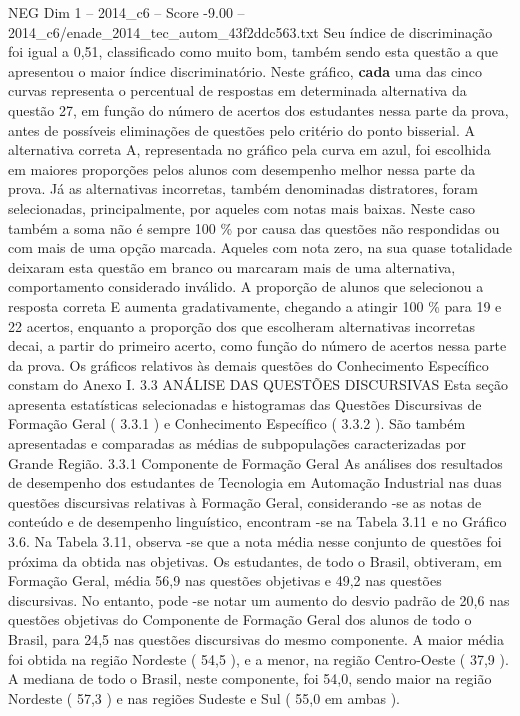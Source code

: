 \begin{textsample}{NEG Dim 1 – 2014\_c6 – Score -9.00 – 2014\_c6/enade\_2014\_tec\_autom\_43f2ddc563.txt}
Seu índice de discriminação foi igual a 0,51, classificado como muito bom, também sendo esta questão a que apresentou o maior índice discriminatório.
Neste gráfico, \textbf{cada} uma das cinco curvas representa o percentual de respostas em determinada alternativa da questão 27, em função do número de acertos dos estudantes nessa parte da prova, antes de possíveis eliminações de questões pelo critério do ponto bisserial.
A alternativa correta A, representada no gráfico pela curva em azul, foi escolhida em maiores proporções pelos alunos com desempenho melhor nessa parte da prova.
Já as alternativas incorretas, também denominadas distratores, foram selecionadas, principalmente, por aqueles com notas mais baixas.
Neste caso também a soma não é sempre 100 \% por causa das questões não respondidas ou com mais de uma opção marcada.
Aqueles com nota zero, na sua quase totalidade deixaram esta questão em branco ou marcaram mais de uma alternativa, comportamento considerado inválido.
A proporção de alunos que selecionou a resposta correta E aumenta gradativamente, chegando a atingir 100 \% para 19 e 22 acertos, enquanto a proporção dos que escolheram alternativas incorretas decai, a partir do primeiro acerto, como função do número de acertos nessa parte da prova.
Os gráficos relativos às demais questões do Conhecimento Específico constam do Anexo I. 3.3 ANÁLISE DAS QUESTÕES DISCURSIVAS Esta seção apresenta estatísticas selecionadas e histogramas das Questões Discursivas de Formação Geral ( 3.3.1 ) e Conhecimento Específico ( 3.3.2 ).
São também apresentadas e comparadas as médias de subpopulações caracterizadas por Grande Região. 3.3.1 Componente de Formação Geral As análises dos resultados de desempenho dos estudantes de Tecnologia em Automação Industrial nas duas questões discursivas relativas à Formação Geral, considerando -se as notas de conteúdo e de desempenho linguístico, encontram -se na Tabela 3.11 e no Gráfico 3.6.
Na Tabela 3.11, observa -se que a nota média nesse conjunto de questões foi próxima da obtida nas objetivas.
Os estudantes, de todo o Brasil, obtiveram, em Formação Geral, média 56,9 nas questões objetivas e 49,2 nas questões discursivas.
No entanto, pode -se notar um aumento do desvio padrão de 20,6 nas questões objetivas do Componente de Formação Geral dos alunos de todo o Brasil, para 24,5 nas questões discursivas do mesmo componente.
A maior média foi obtida na região Nordeste ( 54,5 ), e a menor, na região Centro-Oeste ( 37,9 ).
A mediana de todo o Brasil, neste componente, foi 54,0, sendo maior na região Nordeste ( 57,3 ) e nas regiões Sudeste e Sul ( 55,0 em ambas ).

\end{textsample}
